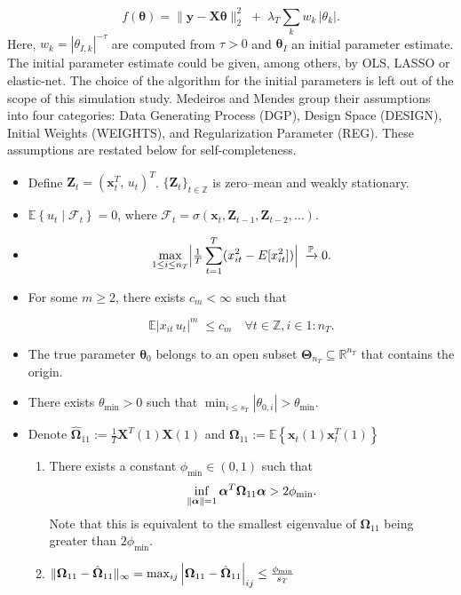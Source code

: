 \documentclass[10pt,a4paper,oneside]{article}
\newcommand{\Z}{\mathbb{Z}}
\newcommand{\Prob}{\mathbb{P}}
\newcommand{\E}{\mathbb{E}}
\newcommand{\SigAl}{\mathcal{F}}
\DeclarePairedDelimiter{\norma}{\lVert}{\rVert} %
\begin{document}
\[
        f(\boldsymbol{\theta}) = \bigl\|\mathbf{y} -  \mathbf{X}\boldsymbol{\theta}\bigr\|_2^2
        \;+\;\lambda_T\sum_{k} w_k\,|\theta_k|.
\]
Here, $w_k = \left| \theta_{I, k} \right|^{-\tau}$ are computed from $\tau > 0$ and $\boldsymbol{\theta}_I$ an initial parameter estimate. The initial parameter estimate could be given, among others, by OLS, LASSO or elastic-net. The choice of the algorithm for the initial parameters is left out of the scope of this simulation study. Medeiros and Mendes group their assumptions into four categories: Data Generating Process (DGP), Design Space (DESIGN), Initial Weights (WEIGHTS), and Regularization Parameter (REG). These assumptions are restated below for self-completeness.


\begin{itemize}
  \item[(DGP1)] Define $\mathbf{Z}_t = (\mathbf{x}_t^T,\,u_t)^T$. $\{\mathbf{Z}_t\}_{t \in \Z}$ is zero–mean and weakly stationary.
  \item[(DGP2)] $\E \left\{ u_t\mid \SigAl_t\right\}=0$, where $\SigAl_t=\sigma(\mathbf{x}_t, \mathbf{Z}_{t-1}, \mathbf{Z}_{t-2},\dots)$.
  \item[(DGP3)] 
  \[
     \max_{1\le i\le n_T}\Bigl|\tfrac1T\sum_{t=1}^T(x_{it}^2 - E[x_{it}^2])\Bigr|\;\xrightarrow[]{\Prob}0.
  \]
  \item[(DGP4)] For some $m \geq 2$, there exists $c_m < \infty$ such that
  
  \[
     \E\bigl|x_{it}\,u_t\bigr|^m\;\le c_m \quad \forall t\in \Z, i \in1:n_T.
  \]

  \item[(DESIGN1)] The true parameter $\boldsymbol{\theta}_0$ belongs to an open subset $\boldsymbol{\Theta}_{n_T} \subseteq \mathbb{R}^{n_T}$ that contains the origin.
  \item[(DESIGN2)] There exists $\theta_{\min} > 0$ such that $\min_{i\le s_T}|\theta_{0,i}|>\theta_{\min}$.
  \item[(DESIGN3)] Denote $\hat{\boldsymbol{\Omega}}_{11} := \frac{1}{T}\mathbf{X}^T(1) \mathbf{X}(1)$ and $\boldsymbol{\Omega}_{11} := \E \left\{ \mathbf{x}_t(1) \mathbf{x}^T_t(1) \right\}$
    \begin{enumerate}
      \item[(a)] There exists a constant $\phi_{\min} \in (0, 1)$ such that
      $$
      \inf_{\norma{\boldsymbol{\alpha}} = 1} \boldsymbol{\alpha}^T \boldsymbol{\Omega}_{11} \boldsymbol{\alpha} > 2 \phi_{\min}.
      $$
      Note that this is equivalent to the smallest eigenvalue of $\boldsymbol{\Omega}_{11}$ being greater than $2\phi_{\min}$.
      \item[(b)] $\norma{\boldsymbol{\Omega}_{11} - \hat{\boldsymbol{\Omega}}_{11}}_{\infty} = \max_{ij} \left| \boldsymbol{\Omega}_{11} - \hat{\boldsymbol{\Omega}}_{11}\right|_{ij} \leq \frac{\phi_{\min}}{s_T}$
      

\end{enumerate}
\end{itemize}
\end{document}
